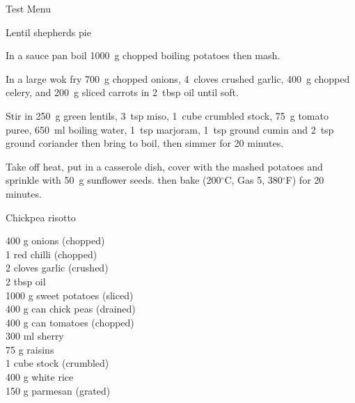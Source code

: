 \begin{menu}{Test Menu}
\begin{recipe}{2}{Lentil shepherds pie}
	
    \begin{instructions}
    \item 
        In a sauce pan boil
        1000~g chopped boiling potatoes
        then mash.
      \item 
        In a large wok fry
        700~g chopped onions,
        4~cloves crushed garlic,
        400~g chopped celery,
        and
        200~g sliced carrots
        in
        2~tbsp  oil
        until soft.
      \item 
        Stir in
        250~g  green lentils,
        3~tsp  miso,
        1~cube crumbled stock,
        75~g  tomato puree,
        650~ml  boiling water,
        1~tsp  marjoram,
        1~tsp  ground cumin
        and
        2~tsp  ground coriander
        then bring to boil,
        then simmer for 20 minutes.
      \item 
        Take off heat,
        put in a casserole dish,
        cover with the mashed potatoes
        and sprinkle with
        50~g  sunflower seeds.
        then bake 
      (200$^{\circ}$C, Gas 5, 380$^{\circ}$F)
     for 20 minutes.
      
    \end{instructions}
    \end{recipe}%
  
    \begin{recipe}{2}{Chickpea risotto}%
    
		\begin{ingredients}
		400 g onions (chopped) \\
	1  red chilli (chopped) \\
	2 cloves garlic (crushed) \\
	2 tbsp oil  \\
	1000 g sweet potatoes (sliced) \\
	400 g can chick peas (drained) \\
	400 g can tomatoes (chopped) \\
	300 ml sherry  \\
	75 g raisins  \\
	1 cube stock (crumbled) \\
	400 g white rice  \\
	150 g parmesan (grated) \\
	
		\end{ingredients}
	

\end{recipe}
\end{menu}
